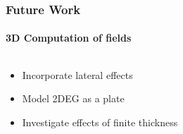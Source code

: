 \documentclass[mathserif,18pt,xcolor=table]{beamer}
\begin{document}
\begin{frame}
\frametitle{Future Work}
\framesubtitle{3D Computation of fields}
\begin{columns}[T] %
  \begin{column}{.5\textwidth}
    \begin{itemize}
      \item Incorporate lateral effects
      \item Model 2DEG as a plate
      \item Investigate effects of finite thickness
    \end{itemize}
  \end{column}
  \begin{column}[T]{.5\textwidth}
    \begin{figure}
      \centering
      \def\svgwidth{1\linewidth}
      
    \end{figure}
  \end{column}%
\end{columns}
\end{frame}
\end{document}
